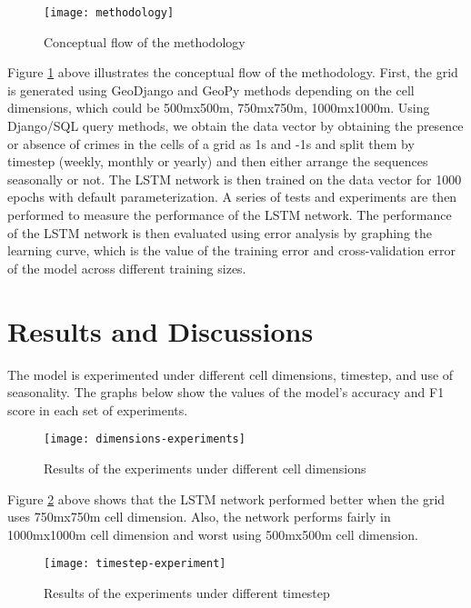 \documentclass[a0]{sciposter}
\begin{document}
\begin{multicols}{2}
    \begin{figure}[ht]
    \centering
    \texttt{[image: methodology]}
    \caption{Conceptual flow of the methodology}
    \label{fig:methodology}
    \end{figure}

    Figure \ref{fig:methodology} above illustrates the conceptual flow of the methodology. First, the grid is generated using GeoDjango and GeoPy methods depending on the cell dimensions, which could be 500mx500m, 750mx750m, 1000mx1000m. Using Django/SQL query methods, we obtain the data vector by obtaining the presence or absence of crimes in the cells of a grid as 1s and -1s and split them by timestep (weekly, monthly or yearly) and then either arrange the sequences seasonally or not. The LSTM network is then trained on the data vector for 1000 epochs with default parameterization. A series of tests and experiments are then performed to measure the performance of the LSTM network. The performance of the LSTM network is then evaluated using error analysis by graphing the learning curve, which is the value of the training error and cross-validation error of the model across different training sizes.
    \section{Results and Discussions}
    The model is experimented under different cell dimensions, timestep, and use of seasonality. The graphs below show the values of the model's accuracy and F1 score in each set of experiments.

    \begin{figure}[ht]
    \centering
    \texttt{[image: dimensions-experiments]}
    \caption{Results of the experiments under different cell dimensions}
    \label{fig:dimension-experiments}
    \end{figure}

    Figure \ref{fig:dimension-experiments} above shows that the LSTM network performed better when the grid uses 750mx750m cell dimension. Also, the network performs fairly in 1000mx1000m cell dimension and worst using 500mx500m cell dimension.

    \begin{figure}[ht]
    \centering
    \texttt{[image: timestep-experiment]}
    \caption{Results of the experiments under different timestep}
    \label{fig:timestep-experiments}
    \end{figure}


\end{multicols}
\end{document}
